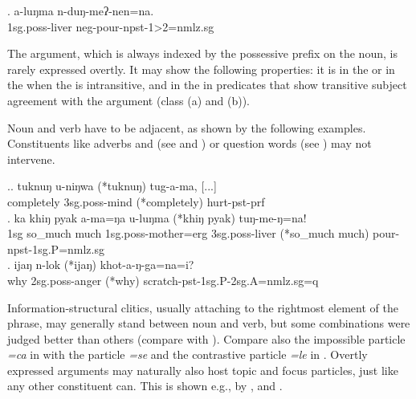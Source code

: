 \exg. a-luŋma n-duŋ-meʔ-nen=na.\\
		{\sc 1sg.poss}-liver {\sc neg-}pour{\sc -npst-1>2=nmlz.sg}\\


The  argument, which is always indexed by the possessive prefix on the noun, is rarely expressed overtly. It may show the following properties: it is in the  or in the  when the  is intransitive, and in the  in predicates that show transitive subject agreement with the  argument (class (a) and (b)). 

Noun and verb have to be adjacent, as shown by the following examples. Constituents like  adverbs and   (see \Next[a] and \Next[b]) or question words (see \Next[c]) may not intervene. 

\ex.\ag. tuknuŋ u-niŋwa (*tuknuŋ) tug-a-ma, [...]\\
 completely {\sc 3sg.poss}-mind  (*completely) hurt{\sc [3sg]-pst-prf}\\
  
 \bg. ka khiŋ pyak a-ma=ŋa u-luŋma  (*khiŋ pyak) tuŋ-me-ŋ=na!\\
 {\sc 1sg} so\_much much {\sc 1sg.poss-}mother{\sc =erg} {\sc 3sg.poss-}liver (*so\_much much) pour{\sc [ 3sg.A]-npst-1sg.P=nmlz.sg}\\
 \bg. ijaŋ n-lok (*ijaŋ) khot-a-ŋ-ga=na=i?\\
 why	{\sc 2sg.poss}-anger (*why) scratch{\sc -pst-1sg.P-2sg.A=nmlz.sg=q}\\


Information-structural clitics, usually attaching to the rightmost element of the phrase, may generally stand between noun and verb, 
but some combinations were judged better than others (compare \Next[a] with \Next[b]). Compare also the impossible  particle \emph{=ca} in \Next[a] with the  particle \emph{=se} and the contrastive particle \emph{=le} in \NNext. Overtly expressed  arguments  may naturally also host topic and focus particles, just like any other constituent can. This is shown e.g., by \Next[b], \NNext[c] and \NNext[d].


